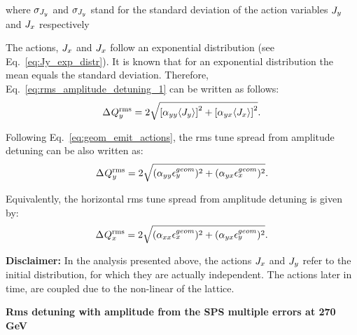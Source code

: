 where $\sigma_{{J_y}}$ and $\sigma_{{J_y}}$ stand for the standard deviation of the action variables ${J_y}$ and ${J_x}$ respectively

The actions, ${J_x}$ and ${J_x}$ follow an exponential distribution (see Eq.~\eqref{eq:Jy_exp_distr}). It is known that for an exponential distribution the mean equals the standard deviation. Therefore, Eq.~\ref{eq:rms_amplitude_detuning_1} can be written as follows:
\begin{equation}\label{eq:rms_amplitute_detuning_2}
    {\Delta\: \!Q^\mathrm{rms}_{y}} = 2 \sqrt{\left [\alpha_{yy} \langle {J_y} \rangle \right ]^2 + \left [ \alpha_{yx} \langle {J_x} \rangle \right ]^2 }.
\end{equation}

Following Eq.~\eqref{eq:geom_emit_actions}, the rms tune spread from amplitude detuning can be also written as:
\begin{equation}\label{eq:rms_amplitute_detuning_3}
    {\Delta\: \!Q^\mathrm{rms}_{y}} = 2 \sqrt{(\alpha_{yy} {\epsilon_y^{geom}} )^2 + ( \alpha_{yx} {\epsilon_x^{geom}})^2 }.
\end{equation}

Equivalently, the horizontal rms tune spread from amplitude detuning is given by:
\begin{equation}\label{eq:rms_amplitute_detuning_3_x}
    {\Delta\: \!Q^\mathrm{rms}_{x}} = 2 \sqrt{(\alpha_{xx} {\epsilon_x^{geom}} )^2 + ( \alpha_{yx} {\epsilon_y^{geom}})^2 }.
\end{equation}


\textbf{Disclaimer:} In the analysis presented above, the actions ${J_x}$ and ${J_y}$ refer to the initial distribution, for which they are actually independent. The actions later in time, are coupled due to the non-linear
of the lattice. %


\normalsize{\textbf{Rms detuning with amplitude from the SPS multiple errors at 270\,GeV}}\\


